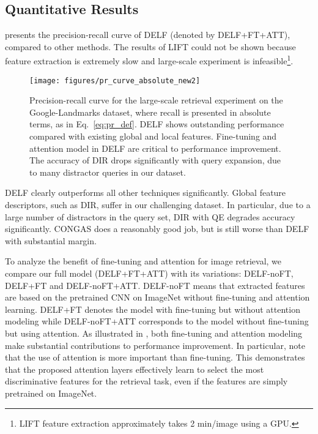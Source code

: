 \documentclass[10pt,twocolumn,letterpaper]{article}
\begin{document}
\subsection{Quantitative Results}
 presents the precision-recall curve of DELF (denoted by DELF+FT+ATT), compared to other methods.
The results of LIFT could not be shown because feature extraction is extremely slow and large-scale experiment is infeasible\footnote{LIFT feature extraction approximately takes 2 min/image using a GPU.}. 
\begin{figure}[t]
\begin{center}
\texttt{[image: figures/pr\_curve\_absolute\_new2]}
\end{center}
\vspace{-15pt}                                                                                                                                                                                                           
   \caption{
Precision-recall curve for the large-scale retrieval experiment on the Google-Landmarks dataset, where recall is presented in absolute terms, as in Eq.~\eqref{eq:pr_def}.  DELF shows outstanding performance compared with existing global and local features.  Fine-tuning and attention model in DELF are critical to performance improvement.  The accuracy of DIR drops significantly with query expansion, due to many distractor queries in our dataset.}
\label{fig:large_scale_results}
\vspace{-5pt}
\end{figure}
DELF clearly outperforms all other techniques significantly.
Global feature descriptors, such as DIR, suffer in our challenging dataset.
In particular, due to a large number of distractors in the query set, DIR with QE degrades accuracy significantly.
CONGAS does a reasonably good job, but is still worse than DELF with substantial margin.

To analyze the benefit of fine-tuning and attention for image retrieval, we compare our full model (DELF+FT+ATT) with its variations: DELF-noFT, DELF+FT and DELF-noFT+ATT.
DELF-noFT means that extracted features are based on the pretrained CNN on ImageNet without fine-tuning and attention learning. 
DELF+FT denotes the model with fine-tuning but without attention modeling while DELF-noFT+ATT corresponds to the model without fine-tuning but using attention.
As illustrated in , both fine-tuning and attention modeling make substantial contributions to performance improvement.
In particular, note that the use of attention is more important than fine-tuning.
This demonstrates that the proposed attention layers effectively learn to select the most discriminative features for the retrieval task, even if the features are simply pretrained on ImageNet.
\end{document}
